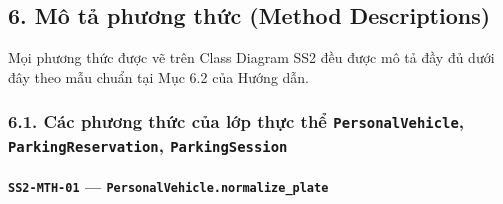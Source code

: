 \documentclass[11pt,a4paper]{article}
\begin{document}
\hypertarget{muxf4-tux1ea3-phux1b0ux1a1ng-thux1ee9c-method-descriptions}{%
\subsection{6. Mô tả phương thức (Method
Descriptions)}\label{muxf4-tux1ea3-phux1b0ux1a1ng-thux1ee9c-method-descriptions}}

Mọi phương thức được vẽ trên Class Diagram SS2 đều được mô tả đầy đủ
dưới đây theo mẫu chuẩn tại Mục 6.2 của Hướng dẫn.

\hypertarget{cuxe1c-phux1b0ux1a1ng-thux1ee9c-cux1ee7a-lux1edbp-thux1ef1c-thux1ec3-personalvehicle-parkingreservation-parkingsession}{%
\subsubsection{\texorpdfstring{6.1. Các phương thức của lớp thực thể
\texttt{PersonalVehicle}, \texttt{ParkingReservation},
\texttt{ParkingSession}}{6.1. Các phương thức của lớp thực thể PersonalVehicle, ParkingReservation, ParkingSession}}\label{cuxe1c-phux1b0ux1a1ng-thux1ee9c-cux1ee7a-lux1edbp-thux1ef1c-thux1ec3-personalvehicle-parkingreservation-parkingsession}}

\hypertarget{ss2-mth-01-personalvehicle.normalize_plate}{%
\paragraph{\texorpdfstring{\texttt{SS2-MTH-01} ---
\texttt{PersonalVehicle.normalize\_plate}}{SS2-MTH-01 --- PersonalVehicle.normalize\_plate}}\label{ss2-mth-01-personalvehicle.normalize_plate}}
\end{document}
